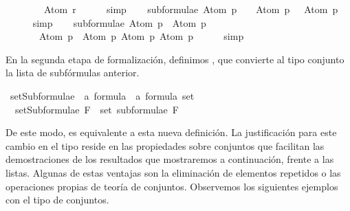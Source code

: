 \begin{isabellebody}
\ \ \ \ \ \ \ \ Atom\ r{\isacharbrackright}{\isachardoublequoteclose}\isanewline
\ \ \ \ \isamarkupfalse%
\ simp\isanewline
\isanewline
\ \ \isamarkupfalse%
\ {\isachardoublequoteopen}subformulae\ {\isacharparenleft}Atom\ p\ \isactrlbold {\isasymand}\ {\isasymbottom}{\isacharparenright}\ {\isacharequal}\ {\isacharbrackleft}Atom\ p\ \isactrlbold {\isasymand}\ {\isasymbottom}{\isacharcomma}\ Atom\ p{\isacharcomma}\ {\isasymbottom}{\isacharbrackright}{\isachardoublequoteclose}\isanewline
\ \ \ \ \isamarkupfalse%
\ simp\isanewline
\isanewline
\ \ \isamarkupfalse%
\ {\isachardoublequoteopen}subformulae\ {\isacharparenleft}Atom\ p\ \isactrlbold {\isasymor}\ Atom\ p{\isacharparenright}\ {\isacharequal}\ \isanewline
\ \ \ \ \ \ \ {\isacharbrackleft}Atom\ p\ \isactrlbold {\isasymor}\ Atom\ p{\isacharcomma}\ Atom\ p{\isacharcomma}\ Atom\ p{\isacharbrackright}{\isachardoublequoteclose}\isanewline
\ \ \ \ \isamarkupfalse%
\ simp%
\endisatagproof
{\isafoldproof}%
%
\isadelimproof
\isanewline
%
\endisadelimproof
{}\isamarkupfalse%
%
\begin{isamarkuptext}%
En la segunda etapa de formalización, definimos 
  , que convierte al tipo conjunto la lista de 
  subfórmulas anterior.%
\end{isamarkuptext}\isamarkuptrue%
\isamarkupfalse%
\ setSubformulae\ {\isacharcolon}{\isacharcolon}\ {\isachardoublequoteopen}{\isacharprime}a\ formula\ {\isasymRightarrow}\ {\isacharprime}a\ formula\ set{\isachardoublequoteclose}\ \isanewline
\ \ {\isachardoublequoteopen}setSubformulae\ F\ {\isasymequiv}\ set\ {\isacharparenleft}subformulae\ F{\isacharparenright}{\isachardoublequoteclose}%
\begin{isamarkuptext}%
De este modo,  es equivalente a esta nueva definición. La justificación para este 
  cambio en el tipo reside en las propiedades sobre conjuntos que facilitan las demostraciones
  de los resultados que mostraremos a continuación, frente a las listas. Algunas de estas ventajas 
  son la eliminación de elementos repetidos o las operaciones propias de teoría de conjuntos. 
  Observemos los siguientes ejemplos con el tipo de conjuntos.%
\end{isamarkuptext}\isamarkuptrue%
\isamarkupfalse%
\isanewline
{}\isanewline
%
\isadelimproof
\ \ %
\endisadelimproof
%
\isatagproof
{}\isamarkupfalse%

\end{isabellebody}
